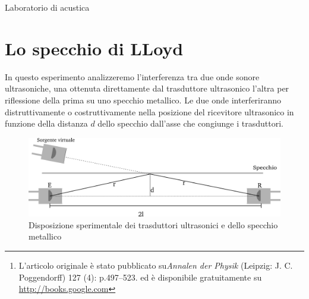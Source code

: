 \documentclass[a4paper,10pt,oneside]{article}
\begin{document}
\begin{center}
{\huge Laboratorio di acustica}
\end{center}

\begin{abstract}
In questo laboratorio ripeteremo l'esperimento di Kundt del 1866\footnote{L'articolo originale è stato pubblicato su\emph{Annalen der Physik} (Leipzig: J. C. Poggendorff) 127 (4): p.497–523. ed è disponibile gratuitamente su \url{http://books.google.com}} avvalendoci di una strumentazione più moderna che ci permetterà di effettuare delle osservazioni e delle misure impossibili ai tempi dello sperimentatore originale. Misureremo la velocità del suono, la lunghezza acustica di un tubo e la disposizione spaziale delle striature che si vengono a formare nella polvere di sughero a causa della risonanza. Avvalendoci di generatori ad ultrasuoni studieremo anche l'interferenza e la diffrazione del suono da parte di ostacoli di varia forma.
\end{abstract}

\vspace{3cm}





\section*{Lo specchio di LLoyd}

In questo esperimento analizzeremo l'interferenza tra due onde sonore ultrasoniche, una ottenuta direttamente dal trasduttore ultrasonico l'altra per riflessione della prima su uno specchio metallico. Le due onde interferiranno distruttivamente o costruttivamente nella posizione del ricevitore ultrasonico in funzione della distanza $d$ dello specchio dall'asse che congiunge i trasduttori.
\begin{figure}[H]
 \centering
 \includegraphics[width=\textwidth]{../Immagini/lloyd1.png}
 \caption{Disposizione sperimentale dei trasduttori ultrasonici e dello specchio metallico}
 \label{fig:llody1}
\end{figure}
\end{document}
